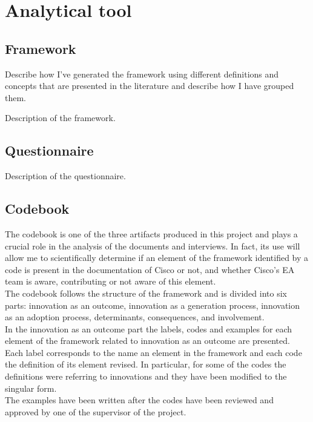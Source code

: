 
\chapter{Analytical tool} %

\label{Chapter4} %



\section{Framework}

Describe how I’ve generated the framework using different definitions and concepts that are presented in the literature and describe how I have grouped them.

Description of the framework.

\section{Questionnaire}
Description of the questionnaire.

\section{Codebook}
The codebook is one of the three artifacts produced in this project and plays a crucial role in the analysis of the documents and interviews.
In fact, its use will allow me to scientifically determine if an element of the framework identified by a code is present in the documentation of Cisco or not, and whether Cisco's EA team is aware, contributing or not aware of this element. \\
The codebook follows the structure of the framework and is divided into six parts: innovation as an outcome, innovation as a generation process, innovation as an adoption process, determinants, consequences, and involvement. \\

In the innovation as an outcome part the labels, codes and examples for each element of the framework related to innovation as an outcome are presented. Each label corresponds to the name an element in the framework and each code the definition of its element revised. In particular, for some of the codes the definitions were referring to innovations and they have been modified to the singular form. \\
The examples have been written after the codes have been reviewed and approved by one of the supervisor of the project. \\



